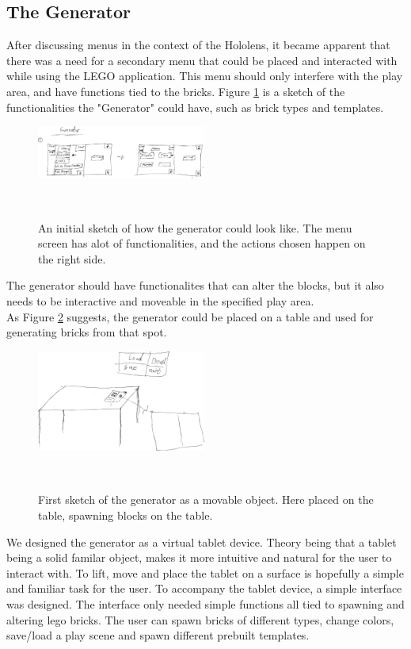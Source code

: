 \subsection{The Generator}
After discussing menus in the context of the Hololens, it became apparent that there was a need for a secondary menu that could be placed and interacted with while using the LEGO application. This menu should only interfere with the play area, and have functions tied to the bricks. Figure \ref{fig:genboard1} is a sketch of the functionalities the "Generator" could have, such as brick types and templates.
\begin{figure}[t]
	\centering
	\includegraphics[width=210px]{figures/Generator/gen5_1.pdf}
	\caption{An initial sketch of how the generator could look like. The menu screen has alot of functionalities, and the actions chosen happen on the right side.}~\label{fig:genboard1}
\end{figure}
The generator should have functionalites that can alter the blocks, but it also needs to be interactive and moveable in the specified play area.\\
As Figure \ref{fig:gentablet} suggests, the generator could be placed on a table and used for generating bricks from that spot.
\begin{figure}[t]
	\centering
	\includegraphics[width=210px]{figures/Generator/gen6_1.pdf}
	\caption{First sketch of the generator as a movable object. Here placed on the table, spawning blocks on the table.}~\label{fig:gentablet}
\end{figure}
We designed the generator as a virtual tablet device. Theory being that a tablet being a solid familar object, makes it more intuitive and natural for the user to interact with. To lift, move and place the tablet on a surface is hopefully a simple and familiar task for the user. To accompany the tablet device, a simple interface was designed. The interface only needed simple functions all tied to spawning and altering lego bricks. The user can spawn bricks of different types, change colors, save/load a play scene and spawn different prebuilt templates.
